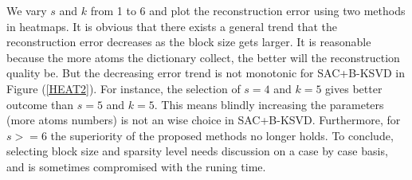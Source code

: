 We vary $s$ and $k$ from 1 to 6 and plot the reconstruction error using two methods in heatmaps. It is obvious that there exists a general trend that the reconstruction error decreases as the block size gets larger. It is reasonable because the more atoms the dictionary collect, the better will the reconstruction quality be. But the decreasing error trend is not monotonic for SAC+B-KSVD in Figure (\ref{HEAT2}). For instance, the selection of $s=4$ and $k=5$ gives better outcome than $s=5$ and $k=5$. This means blindly increasing the parameters (more atoms numbers) is not an wise choice in SAC+B-KSVD. Furthermore, for $s>=6$ the superiority of the proposed methods no longer holds. To conclude, selecting block size and sparsity level needs discussion on a case by case basis, and is sometimes compromised with the runing time.
